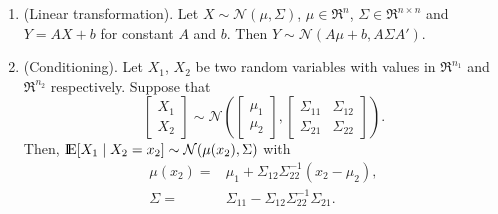 \documentclass[a4paper,10pt]{scrbook}
\begin{document}
\begin{enumerate}
 
 \item (Linear transformation). Let $X\sim \mathcal{N}(\mu,\Sigma)$, $\mu\in\Re^n$, $\Sigma\in\Re^{n\times n}$ 
       and $Y=AX+b$ for constant $A$ and $b$. Then $Y\sim \mathcal{N}(A\mu+b, A\Sigma A')$.
 \item (Conditioning). Let $X_1$, $X_2$ be two random variables with values in $\Re^{n_1}$ and $\Re^{n_2}$
       respectively. Suppose that
\begin{equation*}
        \begin{bmatrix}
         X_1\\X_2
        \end{bmatrix}
{}\sim{}
	\mathcal{N}\left(
	\begin{bmatrix}
         \mu_1\\\mu_2
        \end{bmatrix},
        \begin{bmatrix}
         \Sigma_{11} & \Sigma_{12}\\
         \Sigma_{21} & \Sigma_{22}
        \end{bmatrix}
        \right).
\end{equation*}
Then, \(\E[X_1\mid X_2=x_2] \sim \mathcal{N}(\mu(x_2), \Sigma)\) with 
\begin{align*}
	\mu(x_2) 
{}={}& 
	\mu_1 
{}+{}
	\Sigma_{12}\Sigma_{22}^{-1}(x_2{}-{}\mu_2),
\\
	\Sigma 
{}={}&
	\Sigma_{11}
{}-{}
	\Sigma_{12}\Sigma_{22}^{-1}\Sigma_{21}.
\end{align*}
\end{enumerate}
\end{document}
